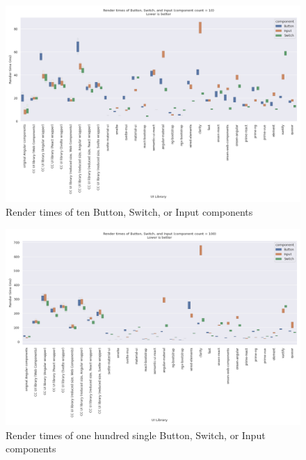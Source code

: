 \begin{figure}[htbp]
  \includegraphics[width=\columnwidth]{plots/render-time-all-big-10.png}
  \caption{Render times of ten Button, Switch, or Input components}
  \label{fig:appendix:render-time-cow-10}
  \centering
\end{figure}

\begin{figure}[htbp]
  \includegraphics[width=\columnwidth]{plots/render-time-all-big-100.png}
  \caption{Render times of one hundred single Button, Switch, or Input components}
  \label{fig:appendix:render-time-cow-100}
  \centering
\end{figure}